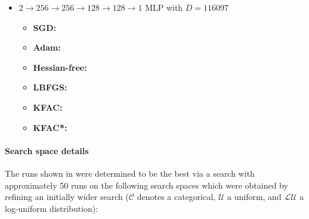 \begin{itemize}
\item $2 \to 256 \to 256\to 128 \to 128 \to 1$ MLP with $D=\num{116097}$
  \begin{itemize}
    \def\pathToRuns{../kfac_pinns_exp/exp23_heat1d_mlp_tanh_256/tex}
  \item \textbf{SGD:} 
  \item \textbf{Adam:} 
  \item \textbf{Hessian-free:} 
  \item \textbf{LBFGS:} 
  \item \textbf{KFAC:} 
  \item \textbf{KFAC*:} 
  \end{itemize}
\end{itemize}

\paragraph{Search space details} The runs shown in  were determined to be the best via a search with approximately 50 runs on the following search spaces which were obtained by refining an initially wider search ($\mathcal{C}$ denotes a categorical, $\mathcal{U}$ a uniform, and $\mathcal{LU}$ a log-uniform distribution):

